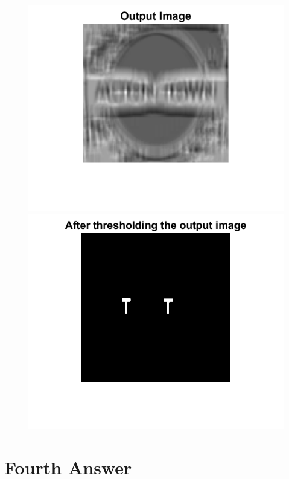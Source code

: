\documentclass[11pt]{article} %
\begin{document}
\begin{figure}
\centering
\includegraphics{Output_Image.png}
\includegraphics{After_Threshlding_Image.png}
\end{figure}
\clearpage

\section {Fourth Answer}
\end{document}
